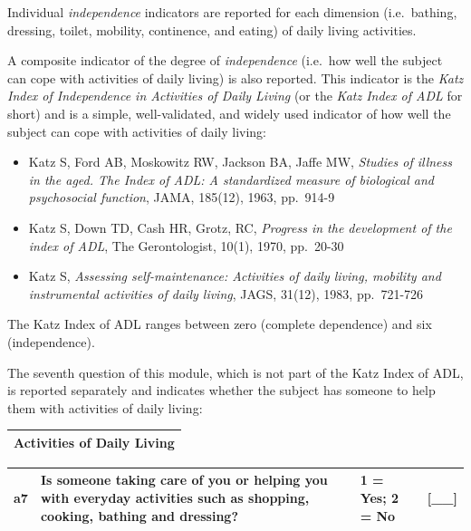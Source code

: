 \documentclass[12pt,a4paper]{book}
\theoremstyle{definition}
\theoremstyle{definition}
\theoremstyle{definition}
\theoremstyle{remark}
\begin{document}
Individual \emph{independence} indicators are reported for each
dimension (i.e.~bathing, dressing, toilet, mobility, continence, and
eating) of daily living activities.

A composite indicator of the degree of \emph{independence} (i.e.~how
well the subject can cope with activities of daily living) is also
reported. This indicator is the \emph{Katz Index of Independence in
Activities of Daily Living} (or the \emph{Katz Index of ADL} for short)
and is a simple, well-validated, and widely used indicator of how well
the subject can cope with activities of daily living:

\begin{itemize}
\item
  Katz S, Ford AB, Moskowitz RW, Jackson BA, Jaffe MW, \emph{Studies of
  illness in the aged. The Index of ADL: A standardized measure of
  biological and psychosocial function}, JAMA, 185(12), 1963, pp.~914-9
\item
  Katz S, Down TD, Cash HR, Grotz, RC, \emph{Progress in the development
  of the index of ADL}, The Gerontologist, 10(1), 1970, pp.~20-30
\item
  Katz S, \emph{Assessing self-maintenance: Activities of daily living,
  mobility and instrumental activities of daily living}, JAGS, 31(12),
  1983, pp.~721-726
\end{itemize}

The Katz Index of ADL ranges between zero (complete dependence) and six
(independence).

The seventh question of this module, which is not part of the Katz Index
of ADL, is reported separately and indicates whether the subject has
someone to help them with activities of daily living:

\begin{longtable}[]{@{}c@{}}
\toprule
\begin{minipage}[t]{0.97\columnwidth}\centering
\textbf{Activities of Daily Living}\strut
\end{minipage}\tabularnewline
\bottomrule
\end{longtable}

\begin{longtable}[]{@{}llll@{}}
\toprule
\begin{minipage}[t]{0.09\columnwidth}\raggedright
a7\strut
\end{minipage} & \begin{minipage}[t]{0.41\columnwidth}\raggedright
Is someone taking care of you or helping you with everyday activities
such as shopping, cooking, bathing and dressing?\strut
\end{minipage} & \begin{minipage}[t]{0.25\columnwidth}\raggedright
1 = Yes; 2 = No\strut
\end{minipage} & \begin{minipage}[t]{0.13\columnwidth}\raggedright
{[}\_\_{]}\strut
\end{minipage}\tabularnewline
\bottomrule
\end{longtable}
\end{document}
